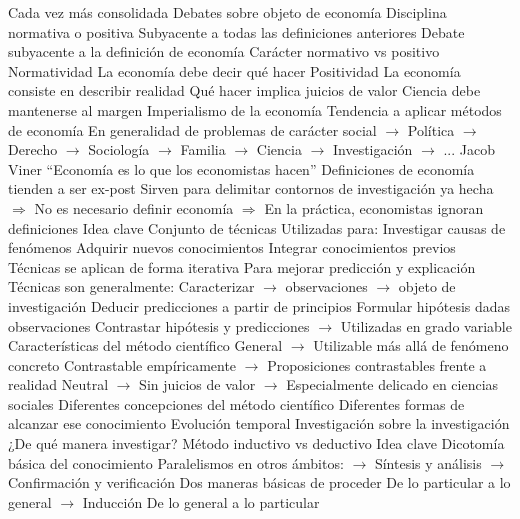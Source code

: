 \documentclass{nuevotema}
\begin{document}
\begin{esquemal}
				\4[] Cada vez más consolidada
		\2 Debates sobre objeto de economía
			\3 Disciplina normativa o positiva
				\4 Subyacente a todas las definiciones anteriores
				\4 Debate subyacente a la definición de economía
				\4[] Carácter normativo vs positivo
				\4 Normatividad
				\4[] La economía debe decir qué hacer
				\4 Positividad
				\4[] La economía consiste en describir realidad
				\4[] Qué hacer implica juicios de valor
				\4[] Ciencia debe mantenerse al margen
			\3 Imperialismo de la economía
				\4 Tendencia a aplicar métodos de economía
				\4[] En generalidad de problemas de carácter social
				\4[] $\to$ Política
				\4[] $\to$ Derecho
				\4[] $\to$ Sociología
				\4[] $\to$ Familia
				\4[] $\to$ Ciencia
				\4[] $\to$ Investigación
				\4[] $\to$ ...
			\3 Jacob Viner
				\4 ``Economía es lo que los economistas hacen''
				\4 Definiciones de economía tienden a ser ex-post
				\4[] Sirven para delimitar contornos de investigación ya hecha
				\4[] $\Rightarrow$ No es necesario definir economía
				\4[] $\Rightarrow$ En la práctica, economistas ignoran definiciones
	\1 
		\2 Idea clave
			\3 Conjunto de técnicas
				\4 Utilizadas para:
				\4[] Investigar causas de fenómenos
				\4[] Adquirir nuevos conocimientos
				\4[] Integrar conocimientos previos
				\4 Técnicas se aplican de forma iterativa
				\4[] Para mejorar predicción y explicación
				\4 Técnicas son generalmente:
				\4[] Caracterizar
				\4[] $\to$ observaciones
				\4[] $\to$ objeto de investigación
				\4[] Deducir predicciones a partir de principios
				\4[] Formular hipótesis dadas observaciones
				\4[] Contrastar hipótesis y predicciones
				\4[] $\to$ Utilizadas en grado variable
			\3 Características del método científico
				\4 General
				\4[] $\to$ Utilizable más allá de fenómeno concreto
				\4 Contrastable empíricamente
				\4[] $\to$ Proposiciones contrastables frente a realidad
				\4 Neutral
				\4[] $\to$ Sin juicios de valor
				\4[] $\to$ Especialmente delicado en ciencias sociales
			\3 Diferentes concepciones del método científico
				\4 Diferentes formas de alcanzar ese conocimiento
				\4 Evolución temporal
				\4[] Investigación sobre la investigación
				\4[] ¿De qué manera investigar?
		\2 Método inductivo vs deductivo
			\3 Idea clave
				\4 Dicotomía básica del conocimiento
				\4[] Paralelismos en otros ámbitos:
				\4[] $\to$ Síntesis y análisis
				\4[] $\to$ Confirmación y verificación
				\4 Dos maneras básicas de proceder
				\4[] De lo particular a lo general
				\4[] $\to$ Inducción
				\4[] De lo general a lo particular

\end{esquemal}
\end{document}
